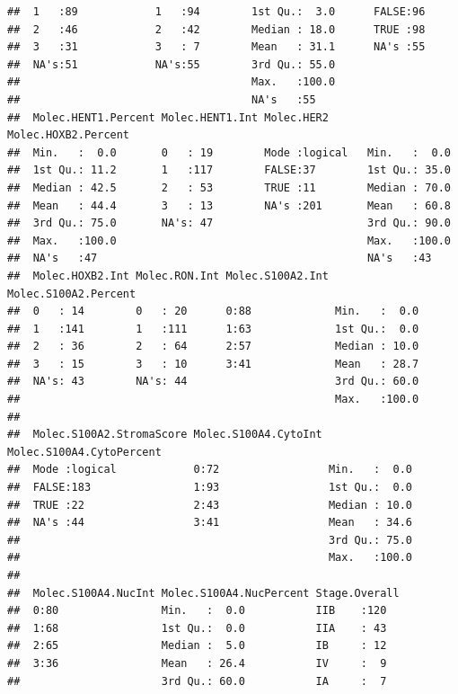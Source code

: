 \documentclass{article}\usepackage[]{graphicx}\usepackage[]{color}
\makeatletter
\newenvironment{kframe}{%
 \def\at@end@of@kframe{}%
 \ifinner\ifhmode%
  \def\at@end@of@kframe{\end{minipage}}%
  \begin{minipage}{\columnwidth}%
 \fi\fi%
 \def\FrameCommand##1{\hskip\@totalleftmargin \hskip-\fboxsep
 \colorbox{shadecolor}{##1}\hskip-\fboxsep
     \hskip-\linewidth \hskip-\@totalleftmargin \hskip\columnwidth}%
 \MakeFramed {\advance\hsize-\width
   \@totalleftmargin\z@ \linewidth\hsize
   \@setminipage}}%
 {\par\unskip\endMakeFramed%
 \at@end@of@kframe}
\newenvironment{knitrout}{}{} %
\makeatother
\begin{document}
\begin{knitrout}
\begin{kframe}
\begin{verbatim}
##  1   :89            1   :94        1st Qu.:  3.0      FALSE:96            
##  2   :46            2   :42        Median : 18.0      TRUE :98            
##  3   :31            3   : 7        Mean   : 31.1      NA's :55            
##  NA's:51            NA's:55        3rd Qu.: 55.0                          
##                                    Max.   :100.0                          
##                                    NA's   :55                             
##  Molec.HENT1.Percent Molec.HENT1.Int Molec.HER2      Molec.HOXB2.Percent
##  Min.   :  0.0       0   : 19        Mode :logical   Min.   :  0.0      
##  1st Qu.: 11.2       1   :117        FALSE:37        1st Qu.: 35.0      
##  Median : 42.5       2   : 53        TRUE :11        Median : 70.0      
##  Mean   : 44.4       3   : 13        NA's :201       Mean   : 60.8      
##  3rd Qu.: 75.0       NA's: 47                        3rd Qu.: 90.0      
##  Max.   :100.0                                       Max.   :100.0      
##  NA's   :47                                          NA's   :43         
##  Molec.HOXB2.Int Molec.RON.Int Molec.S100A2.Int Molec.S100A2.Percent
##  0   : 14        0   : 20      0:88             Min.   :  0.0       
##  1   :141        1   :111      1:63             1st Qu.:  0.0       
##  2   : 36        2   : 64      2:57             Median : 10.0       
##  3   : 15        3   : 10      3:41             Mean   : 28.7       
##  NA's: 43        NA's: 44                       3rd Qu.: 60.0       
##                                                 Max.   :100.0       
##                                                                     
##  Molec.S100A2.StromaScore Molec.S100A4.CytoInt Molec.S100A4.CytoPercent
##  Mode :logical            0:72                 Min.   :  0.0           
##  FALSE:183                1:93                 1st Qu.:  0.0           
##  TRUE :22                 2:43                 Median : 10.0           
##  NA's :44                 3:41                 Mean   : 34.6           
##                                                3rd Qu.: 75.0           
##                                                Max.   :100.0           
##                                                                        
##  Molec.S100A4.NucInt Molec.S100A4.NucPercent Stage.Overall
##  0:80                Min.   :  0.0           IIB    :120  
##  1:68                1st Qu.:  0.0           IIA    : 43  
##  2:65                Median :  5.0           IB     : 12  
##  3:36                Mean   : 26.4           IV     :  9  
##                      3rd Qu.: 60.0           IA     :  7  

\end{verbatim}
\end{kframe}
\end{knitrout}
\end{document}
